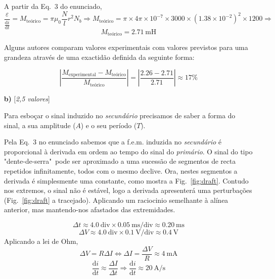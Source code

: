 \documentclass[11pt,a4paper,final]{article}
\begin{document}
A partir da Eq.~3 do enunciado,
\begin{equation*}
\frac{\varepsilon}{\frac{\mathrm d i}{\mathrm d t}}=M_\text{te\'{o}rico}=\pi\mu_0\frac{N}{l}r^2N_b \Rightarrow M_\text{te\'{o}rico}=\pi\times 4\pi \times 10^{-7} \times 3000 \times \left(1.38 \times 10^{-2}\right)^2\times 1200 \Rightarrow
\end{equation*}
\begin{equation*}
\boxed{M_\text{te\'{o}rico}=2.71~\text{mH}}
\end{equation*}

Alguns autores comparam valores experimentais com valores previstos para uma grandeza atrav\'{e}s de uma exactid\~{a}o definida da seguinte forma:

\begin{equation*}
\left|\frac{M_\text{experimental}-M_\text{te\'{o}rico}}{M_\text{te\'{o}rico}}\right|=\left|\frac{2.26-2.71}{2.71}\right|\approx 17\%
\end{equation*}

\textbf{b)} \hfill [\textit{2,5 valores}]

Para esbo\c{c}ar o sinal induzido no \emph{secund\'{a}rio} precisamos de saber a forma do sinal, a sua amplitude ($A$) e o seu per\'{i}odo ($T$).

Pela Eq.~3 no enunciado sabemos que a f.e.m. induzida no \emph{secund\'{a}rio} \'{e} proporcional \`{a} derivada em ordem ao tempo do sinal do \emph{prim\'{a}rio}. O sinal do tipo "dente-de-serra"~pode ser aproximado a uma sucess\~{a}o de segmentos de recta repetidos infinitamente, todos com o mesmo declive. Ora, nestes segmentos a derivada \'{e} simplesmente uma constante, como mostra a Fig.~\ref{fig:draft}. Contudo nos extremos, o sinal n\~{a}o \'{e} est\'{a}vel, logo a derivada apresenter\'{a} uma perturba\c{c}\~{o}es (Fig.~\ref{fig:draft} a tracejado). Aplicando um raciocinio semelhante \`{a} al\'{i}nea anterior, mas mantendo-nos afastados das extremidades.

\begin{equation*}
\Delta t \approx 4.0~\text{div}\times 0.05~\text{ms/div} \approx 0.20~\text{ms}
\end{equation*}
\begin{equation*}
\Delta V \approx 4.0~\text{div}\times 0.1~\text{V/div} \approx 0.4~\text{V}
\end{equation*}
Aplicando a lei de Ohm,
\begin{equation*}
\Delta V =R\Delta I\Leftrightarrow \Delta I = \frac{\Delta V}{R}\approx 4~\text{mA}
\end{equation*}
\begin{equation*}
\frac{\mathrm d i}{\mathrm d t}\approx\frac{\Delta I}{\Delta t}\Rightarrow\frac{\mathrm d i}{\mathrm d t}\approx20~\text{A/s}
\end{equation*}
\end{document}
